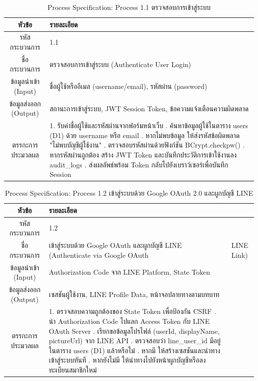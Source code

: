 \begin{table}[htbp]
\centering
\caption{Process Specification: Process 1.1 ตรวจสอบการเข้าสู่ระบบ}
\label{tab3:pspec1_1}
\begin{tabularx}{\textwidth}{| c | L |}
\hline
\textbf{หัวข้อ} & \textbf{รายละเอียด} \\ \hline
รหัสกระบวนการ & 1.1 \\ \hline
ชื่อกระบวนการ & ตรวจสอบการเข้าสู่ระบบ (Authenticate User Login) \\ \hline
ข้อมูลนำเข้า (Input) & ชื่อผู้ใช้หรืออีเมล (username/email), รหัสผ่าน (password) \\ \hline
ข้อมูลส่งออก (Output) & สถานะการเข้าสู่ระบบ, JWT Session Token, ข้อความแจ้งเตือนความผิดพลาด \\ \hline
ตรรกะการประมวลผล & 1. รับค่าชื่อผู้ใช้และรหัสผ่านจากฟอร์มหน้าเว็บ . ค้นหาข้อมูลผู้ใช้ในตาราง users (D1) ด้วย username หรือ email . หากไม่พบข้อมูล ให้ส่งรหัสข้อผิดพลาด "ไม่พบบัญชีผู้ใช้งาน" . ตรวจสอบรหัสผ่านด้วยฟังก์ชัน BCrypt.checkpw() . หากรหัสผ่านถูกต้อง สร้าง JWT Token และบันทึกประวัติการเข้าใช้งานลง audit\_logs . ส่งผลลัพธ์พร้อม Token กลับไปยังเบราว์เซอร์เพื่อบันทึก Session \\ \hline
\end{tabularx}
\end{table}

\begin{table}[htbp]
\centering
\caption{Process Specification: Process 1.2 เข้าสู่ระบบด้วย Google OAuth 2.0 และผูกบัญชี LINE}
\label{tab3:pspec1_2}
\begin{tabularx}{\textwidth}{| c | L |}
\hline
\textbf{หัวข้อ} & \textbf{รายละเอียด} \\ \hline
รหัสกระบวนการ & 1.2 \\ \hline
ชื่อกระบวนการ & เข้าสู่ระบบด้วย Google OAuth และผูกบัญชี LINE (Authenticate via Google OAuth & LINE Link) \\ \hline
ข้อมูลนำเข้า (Input) & Authorization Code จาก LINE Platform, State Token \\ \hline
ข้อมูลส่งออก (Output) & เซสชันผู้ใช้งาน, LINE Profile Data, หน้าจอปลายทางตามบทบาท \\ \hline
ตรรกะการประมวลผล & 1. ตรวจสอบความถูกต้องของ State Token เพื่อป้องกัน CSRF . นำ Authorization Code ไปแลก Access Token กับ LINE OAuth Server . เรียกขอข้อมูลโปรไฟล์ (userId, displayName, pictureUrl) จาก LINE API . ตรวจสอบว่า line\_user\_id มีอยู่ในตาราง users (D1) แล้วหรือไม่ . หากมี ให้สร้างเซสชันและนำทางเข้าสู่ระบบทันที . หากยังไม่มี ให้นำทางไปยังหน้าผูกบัญชีหรือลงทะเบียนสมาชิกใหม่ \\ \hline
\end{tabularx}
\end{table}

